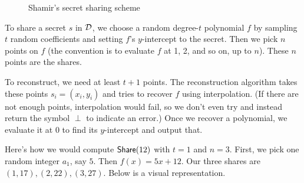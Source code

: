 \begin{figure}[h!]
\begin{pchstack}[center]
\end{pchstack}
\caption{Shamir's secret sharing scheme}
\label{fig:shamirSS}
\end{figure}

To share a secret $s$ in $\mathcal{D}$, we choose a random 
degree-$t$ polynomial $f$ by sampling $t$ random coefficients and 
setting $f$'s $y$-intercept to the secret. Then we pick $n$ points 
on $f$ (the convention is to evaluate $f$ at 1, 2, and so on, up 
to $n$)\footnotemark. These $n$ points are the shares.

To reconstruct, we need at least $t+1$ points. The reconstruction 
algorithm takes these points $s_i = (x_i, y_i)$ and tries to recover 
$f$ using interpolation. (If there are not enough points, interpolation 
would fail, so we don't even try and instead return the symbol $\perp$ to indicate an error.)
Once we recover a polynomial, we evaluate it at 0 to find its 
$y$-intercept and output that.

\begin{example}
    Here's how we would compute $\mathsf{Share}(12)$ with $t=1$ and $n=3$.
    First, we pick one random integer $a_1$, say $5$. Then $f(x)
    = 5x + 12$. Our three shares are $(1,17),(2,22),(3,27)$. Below 
    is a visual representation.
\end{example}

